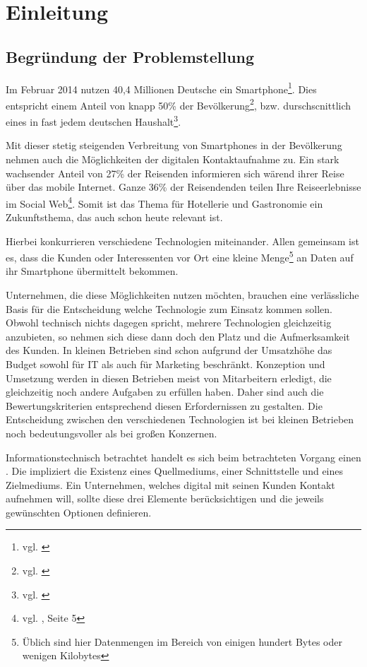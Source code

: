 \section{Einleitung}
\label{sec:einleitung}

\subsection{Begründung der Problemstellung} %

Im Februar 2014 nutzen 40,4 Millionen Deutsche ein Smartphone\footnote{vgl. \cite{netzoekonom}}. Dies entspricht einem Anteil von knapp 50\% der Bevölkerung\footnote{vgl. \cite{destatis:bev}}, bzw. durschscnittlich eines in fast jedem deutschen Haushalt\footnote{vgl. \cite{destatis:hh}}. 

Mit dieser stetig steigenden Verbreitung von Smartphones in der Bevölkerung nehmen auch die Möglichkeiten der digitalen Kontaktaufnahme zu. 
Ein stark wachsender Anteil von 27\% der Reisenden informieren sich wärend ihrer Reise über das mobile Internet. Ganze 36\% der Reisendenden  teilen Ihre Reiseerlebnisse im Social Web\footnote{vgl. \cite{reiseanalyse}, Seite 5}. Somit ist das Thema für Hotellerie und Gastronomie ein Zukunftsthema, das auch schon heute relevant ist.

Hierbei konkurrieren verschiedene Technologien miteinander. Allen gemeinsam ist es, dass die Kunden oder Interessenten vor Ort eine kleine Menge\footnote{Üblich sind hier Datenmengen im Bereich von einigen hundert Bytes oder wenigen Kilobytes} an Daten auf ihr Smartphone übermittelt bekommen.

Unternehmen, die diese Möglichkeiten nutzen möchten, brauchen eine verlässliche Basis für die Entscheidung welche Technologie zum Einsatz kommen sollen. Obwohl technisch nichts dagegen spricht, mehrere Technologien gleichzeitig anzubieten, so nehmen sich diese dann doch den Platz und die Aufmerksamkeit des Kunden. In kleinen Betrieben sind schon aufgrund der Umsatzhöhe das Budget sowohl für IT als auch für Marketing beschränkt. Konzeption und Umsetzung werden in diesen Betrieben meist von Mitarbeitern erledigt, die gleichzeitig noch andere Aufgaben zu erfüllen haben. Daher sind auch die Bewertungskriterien entsprechend diesen Erfordernissen zu gestalten. Die Entscheidung zwischen den verschiedenen Technologien ist bei kleinen Betrieben noch bedeutungsvoller als bei großen Konzernen.

Informationstechnisch betrachtet handelt es sich beim betrachteten Vorgang einen . Die impliziert die Existenz eines Quellmediums, einer Schnittstelle und eines Zielmediums. Ein Unternehmen, welches digital mit seinen Kunden Kontakt aufnehmen will, sollte diese drei Elemente berücksichtigen und die jeweils gewünschten Optionen definieren.

